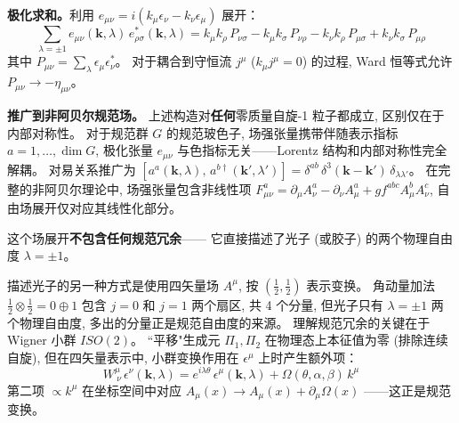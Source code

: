 \textbf{极化求和。}利用 $e_{\mu\nu}=i(k_\mu\epsilon_\nu - k_\nu\epsilon_\mu)$ 展开：
\begin{equation}
    \sum_{\lambda=\pm 1} e_{\mu\nu}(\mathbf{k},\lambda)\,e^*_{\rho\sigma}(\mathbf{k},\lambda)
    = k_\mu k_\rho\,P_{\nu\sigma} - k_\mu k_\sigma\,P_{\nu\rho}
    - k_\nu k_\rho\,P_{\mu\sigma} + k_\nu k_\sigma\,P_{\mu\rho}
\end{equation}
其中 $P_{\mu\nu}=\sum_\lambda \epsilon_\mu\epsilon^*_\nu$。
对于耦合到守恒流 $j^\mu$ ($k_\mu j^\mu=0$) 的过程,
Ward 恒等式允许 $P_{\mu\nu}\to -\eta_{\mu\nu}$。

\textbf{推广到非阿贝尔规范场。}
上述构造对\textbf{任何}零质量自旋-1 粒子都成立, 区别仅在于内部对称性。
对于规范群 $G$ 的规范玻色子, 场强张量携带伴随表示指标 $a=1,\ldots,\dim G$,
极化张量 $e_{\mu\nu}$ 与色指标无关——Lorentz 结构和内部对称性完全解耦。
对易关系推广为
$[a^a(\mathbf{k},\lambda),\,a^{b\dagger}(\mathbf{k}',\lambda')]
= \delta^{ab}\,\delta^3(\mathbf{k}-\mathbf{k}')\,\delta_{\lambda\lambda'}$。
在完整的非阿贝尔理论中, 场强张量包含非线性项
$F^a_{\mu\nu} = \partial_\mu A^a_\nu - \partial_\nu A^a_\mu + gf^{abc}A^b_\mu A^c_\nu$,
自由场展开仅对应其线性化部分。

这个场展开\textbf{不包含任何规范冗余}——
它直接描述了光子 (或胶子) 的两个物理自由度 $\lambda=\pm 1$。

描述光子的另一种方式是使用四矢量场 $A^\mu$, 按 $(\frac{1}{2},\frac{1}{2})$ 表示变换。
角动量加法 $\frac{1}{2}\otimes\frac{1}{2}=0\oplus 1$ 包含 $j=0$ 和 $j=1$ 两个扇区,
共 4 个分量, 但光子只有 $\lambda=\pm 1$ 两个物理自由度,
多出的分量正是规范自由度的来源。
理解规范冗余的关键在于 Wigner 小群 $ISO(2)$。
``平移"生成元 $\Pi_1,\Pi_2$ 在物理态上本征值为零 (排除连续自旋),
但在四矢量表示中, 小群变换作用在 $\epsilon^\mu$ 上时产生额外项：
\begin{equation}
    W^\mu_{\ \nu}\,\epsilon^\nu(\mathbf{k},\lambda) =
    e^{i\lambda\theta}\,\epsilon^\mu(\mathbf{k},\lambda) + \Omega(\theta,\alpha,\beta)\,k^\mu
\end{equation}
第二项 $\propto k^\mu$ 在坐标空间中对应 $A_\mu(x)\to A_\mu(x)+\partial_\mu\Omega(x)$
——这正是规范变换。

\begin{center}
\end{center}

